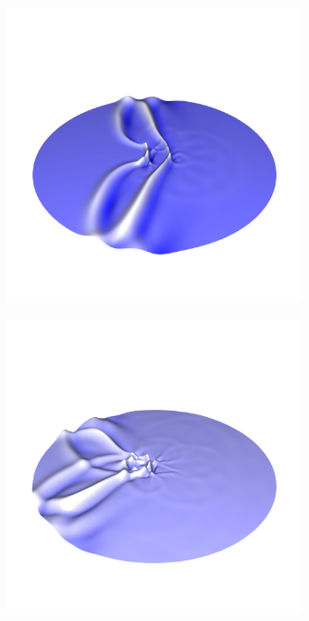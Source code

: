 \documentclass[crop=false,10pt,ngerman]{standalone}
\begin{document}
\begin{figure}[h]
        \begin{subfigure}[b]{0.24\textwidth}
          \center
          \includegraphics[trim={1.5cm 3.05cm 1.5cm 5.2cm},clip,width=0.95\textwidth]{images/circle_wave_4.png}
          \caption{}
        \end{subfigure}
        \begin{subfigure}[b]{0.24\textwidth}
          \center
          \includegraphics[trim={1.5cm 3.05cm 1.5cm 5.2cm},clip,width=0.95\textwidth]{images/circle_wave_5.png}

\end{subfigure}
\end{figure}
\end{document}
